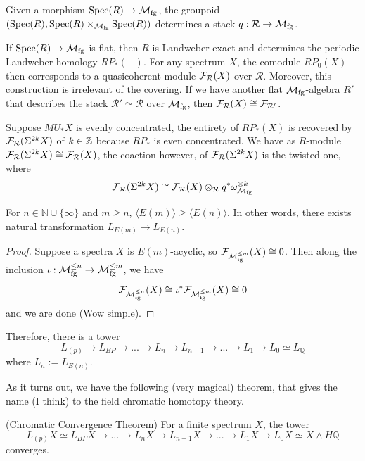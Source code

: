 \begin{remark}
    Given a morphism $\operatorname{\mathrm{Spec}}(R)\to \mathcal{M}_{\mathrm{fg}}$, the groupoid $(\operatorname{\mathrm{Spec}}(R), \operatorname{\mathrm{Spec}}(R)\times_{\mathcal{M}_{\mathrm{fg}}}\operatorname{\mathrm{Spec}}(R))$ determines a stack $q:\mathcal{R}\to \mathcal{M}_{\mathrm{fg}}$. 

    If $\operatorname{\mathrm{Spec}}(R)\to \mathcal{M}_{\mathrm{fg}}$ is flat, then $R$ is Landweber exact and determines the periodic Landweber homology $RP_*(-)$. For any spectrum $X$, the comodule $RP_0(X)$ then corresponds to a quasicoherent module $\mathcal{F}_{\mathcal{R}}(X)$ over $\mathcal{R}$.
    Moreover, this construction is irrelevant of the covering. If we have another flat $\mathcal{M}_{\mathrm{fg}}$-algebra $R'$ that describes the stack $\mathcal{R}'\simeq \mathcal{R}$ over $\mathcal{M}_{\mathrm{fg}}$, then $\mathcal{F}_{\mathcal{R}}(X)\cong \mathcal{F}_{\mathcal{R'}}$.

    Suppose $MU_*X$ is evenly concentrated, the entirety of $RP_*(X)$ is recovered by $\mathcal{F}_{\mathcal{R}}(\Sigma^{2k}X)$ of $k\in \mathbb{Z}$ 
    because $RP_*$ is even concentrated. We have as $R$-module $\mathcal{F}_{\mathcal{R}}(\Sigma^{2k}X)\cong \mathcal{F}_{\mathcal{R}}(X)$, the coaction however, of 
    $\mathcal{F}_{\mathcal{R}}(\Sigma^{2k}X)$ is the twisted one, where 
    \[
    \mathcal{F}_{\mathcal{R}}(\Sigma^{2k}X)\cong \mathcal{F}_{\mathcal{R}}(X)\otimes_{\mathcal{R}}q^*\omega_{\mathcal{M}_{\mathrm{fg}}}^{\otimes k}
    \]
\end{remark}

\begin{proposition}
    For $n\in \mathbb{N}\cup\{\infty\}$ and $m\geq n$, $\langle E(m)\rangle \geq \langle E(n)\rangle$. In other words, there exists natural transformation $L_{E(m)}\to L_{E(n)}$.
\end{proposition}
\begin{proof}
    Suppose a spectra $X$ is $E(m)$-acyclic, so $\mathcal{F}_{\mathcal{M}_{\mathrm{fg}}^{\leq m}}(X)\cong 0$. Then along the inclusion $\iota: \mathcal{M}_{\mathrm{fg}}^{\leq n}\to \mathcal{M}_{\mathrm{fg}}^{\leq m}$, we have 
    \[
  \mathcal{F}_{\mathcal{M}_{\mathrm{fg}}^{\leq n}}(X) \cong \iota^*\mathcal{F}_{\mathcal{M}_{\mathrm{fg}}^{\leq m}}(X)\cong 0
    \]and we are done (Wow simple).
\end{proof}

Therefore, there is a tower 
\[
    L_{(p)}\to L_{BP}\to ...\to L_n\to L_{n-1}\to ...\to L_1\to L_0\simeq L_{\mathbb{Q}}
\]where $L_n:=L_{E(n)}$.

As it turns out, we have the following (very magical) theorem, that gives the name (I think) to the field chromatic homotopy theory.
\begin{theorem}(Chromatic Convergence Theorem)
    For a finite spectrum $X$, the tower
    \[
     L_{(p)}X\simeq L_{BP} X\to ...\to L_nX \to L_{n-1}X\to ...\to L_1X\to L_0X\simeq X\wedge H\mathbb{Q}
    \]converges.
\end{theorem}

